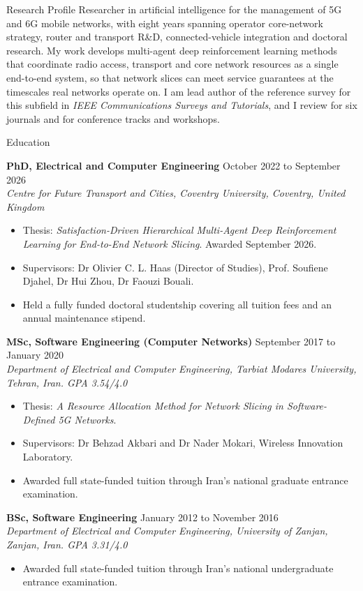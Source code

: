 \documentclass{resume}
\newcommand{\entry}[2]{{\bf #1} \hfill {#2}\\}
\newcommand{\sub}[1]{{\em #1}\par}
\begin{document}
\begin{rSection}{Research Profile}
Researcher in artificial intelligence for the management of 5G and 6G mobile networks, with eight years spanning operator core-network strategy, router and transport R\&D, connected-vehicle integration and doctoral research. My work develops multi-agent deep reinforcement learning methods that coordinate radio access, transport and core network resources as a single end-to-end system, so that network slices can meet service guarantees at the timescales real networks operate on. I am lead author of the reference survey for this subfield in \textit{IEEE Communications Surveys and Tutorials}, and I review for six journals and for conference tracks and workshops.
\end{rSection}

\begin{rSection}{Education}

\entry{PhD, Electrical and Computer Engineering}{October 2022 to September 2026}
\sub{Centre for Future Transport and Cities, Coventry University, Coventry, United Kingdom}
\begin{itemize}
  \item Thesis: \textit{Satisfaction-Driven Hierarchical Multi-Agent Deep Reinforcement Learning for End-to-End Network Slicing}. Awarded September 2026.
  \item Supervisors: Dr Olivier C. L. Haas (Director of Studies), Prof. Soufiene Djahel, Dr Hui Zhou, Dr Faouzi Bouali.
  \item Held a fully funded doctoral studentship covering all tuition fees and an annual maintenance stipend.
\end{itemize}
\smallskip

\entry{MSc, Software Engineering (Computer Networks)}{September 2017 to January 2020}
\sub{Department of Electrical and Computer Engineering, Tarbiat Modares University, Tehran, Iran. GPA 3.54/4.0}
\begin{itemize}
  \item Thesis: \textit{A Resource Allocation Method for Network Slicing in Software-Defined 5G Networks}.
  \item Supervisors: Dr Behzad Akbari and Dr Nader Mokari, Wireless Innovation Laboratory.
  \item Awarded full state-funded tuition through Iran's national graduate entrance examination.
\end{itemize}
\smallskip

\entry{BSc, Software Engineering}{January 2012 to November 2016}
\sub{Department of Electrical and Computer Engineering, University of Zanjan, Zanjan, Iran. GPA 3.31/4.0}
\begin{itemize}
  \item Awarded full state-funded tuition through Iran's national undergraduate entrance examination.
\end{itemize}

\end{rSection}
\end{document}
